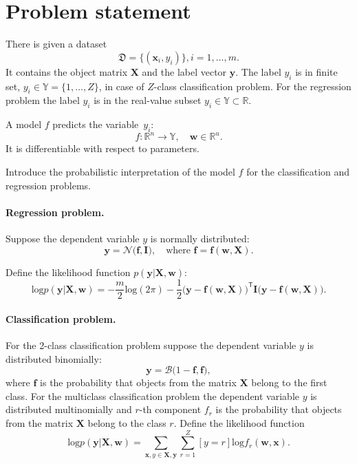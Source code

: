 \documentclass[smallcondensed]{svjour3}
\begin{document}
\section{Problem statement}
\label{prob_stat}
There is given a dataset \begin{equation}\label{eq:dataset}\mathfrak{D} = \{(\mathbf{x}_i,y_i)\}, i = 1,\dots,m.\end{equation} It contains the object matrix $\mathbf{X}$ and the label vector  $\mathbf{y}$. The label  ${y_i}$ is in finite set, ${y}_i \in \mathbb{Y} = \{1, \dots, Z\}$, in case of $Z$-class classification problem. For the regression problem the label $y_i$ is in the real-value subset ${y_i} \in \mathbb{Y} \subset  \mathbb{R}$.

A model $f$ predicts the variable~$y_i$:
\[
	f:\mathbb{R}^n \to \mathbb{Y}, \quad \mathbf{w} \in \mathbb{R}^u.
\]
It is differentiable with respect to parameters.

Introduce the probabilistic interpretation of the model $f$ for the classification and regression problems.

\paragraph{Regression problem.}
Suppose the dependent variable $y$ is normally distributed:
\begin{equation}
\label{eq:reg}
\mathbf{y} = \mathcal{N}\bigl(\mathbf{f}, \mathbf{I}\bigr),\quad \text{where }\mathbf{f} = \mathbf{f}(\mathbf{w}, \mathbf{X}).
\end{equation}


Define the likelihood function $p(\mathbf{y}|\mathbf{X}, \mathbf{w})$:
\[
	\text{log}p(\mathbf{y}|\mathbf{X}, \mathbf{w}) =-\frac{m}{2}\text{log}(2\pi)   -\frac{1}{2}\bigl(\mathbf{y} - \mathbf{f}(\mathbf{w}, \mathbf{X}))^\mathsf{T}\mathbf{I}(\mathbf{y} - \mathbf{f}(\mathbf{w}, \mathbf{X})\bigr).
\] 

\paragraph{Classification problem.}
For the 2-class classification problem suppose the dependent variable $y$  is distributed binomially:
\begin{equation}
\label{eq:cl}
	\mathbf{y} = \mathcal{B}\bigl(1-\mathbf{f}, \mathbf{f}\bigr),
\end{equation}
where  $\mathbf{f}$ is the probability that objects from the matrix $\mathbf{X}$  belong to the first class.
For the multiclass classification problem the  dependent variable $y$  is distributed multinomially and $r$-th component ${f}_r$ is the probability that objects from the matrix $\mathbf{X}$  belong to the class $r$. Define the likelihood function
\[
	\text{log}p(\mathbf{y}|\mathbf{X}, \mathbf{w}) = \sum_{\mathbf{x}, y \in \mathbf{X}, \mathbf{y}} \sum_{r=1}^Z[y=r] \text{log}{f}_r(\mathbf{w}, \mathbf{x}).
\] 
\end{document}
